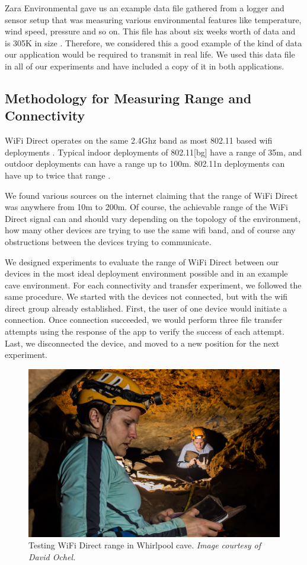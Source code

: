 \documentclass[10pt,twocolumn]{article}
\begin{document}
Zara Environmental gave us an example data file gathered from a logger and sensor setup that was measuring various environmental features like temperature, wind speed, pressure and so on.
This file has about six weeks worth of data and is 305K in size \cite{datafile}.
Therefore, we considered this a good example of the kind of data our application would be required to transmit in real life.
We used this data file in all of our experiments and have included a copy of it in both applications.

\subsection{Methodology for Measuring Range and Connectivity}
\label{sec:Methodology}
WiFi Direct operates on the same 2.4Ghz band as most 802.11 based wifi deployments \cite{wifiwhitepaper}.
Typical indoor deployments of 802.11[bg] have a range of 35m, and outdoor deployments can have a range up to 100m.
802.11n deployments can have up to twice that range \cite{wikiwifi}.

We found various sources on the internet claiming that the range of WiFi Direct was anywhere from 10m to 200m. 
Of course, the achievable range of the WiFi Direct signal can and should vary depending on the topology of the environment, how many other devices are trying to use the same wifi band, and of course any obstructions between the devices trying to communicate.

We designed experiments to evaluate the range of WiFi Direct between our devices in the most ideal deployment environment possible and in an example cave environment.
For each connectivity and transfer experiment, we followed the same procedure. 
We started with the devices not connected, but with the wifi direct group already established.
First, the user of one device would initiate a connection.
Once connection succeeded, we would perform three file transfer attempts using the response of the app to verify the success of each attempt.
Last, we disconnected the device, and moved to a new position for the next experiment.

\begin{figure}
\includegraphics[width=\columnwidth]{cavewifi}
\caption{Testing WiFi Direct range in Whirlpool cave. \textit{Image courtesy of David Ochel.}}
\end{figure}
\end{document}
